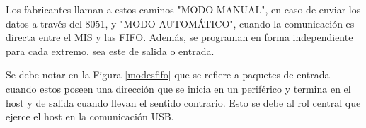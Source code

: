 	Los fabricantes llaman a estos caminos "MODO MANUAL", en caso de enviar los datos a través del 8051, y "MODO AUTOMÁTICO", cuando la comunicación es directa entre el MIS y las FIFO. Además, se programan en forma independiente para cada extremo, sea este de salida o entrada.%
	
	Se debe notar en la Figura \ref{modesfifo} que se refiere a paquetes de entrada cuando estos poseen una dirección que se inicia en un periférico y termina en el host y de salida cuando llevan el sentido contrario. Esto se debe al rol central que ejerce el host en la comunicación USB.